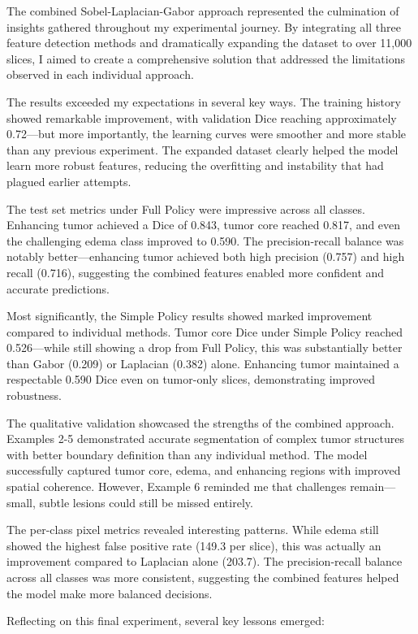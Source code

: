 The combined Sobel-Laplacian-Gabor approach represented the culmination of insights gathered throughout my experimental journey. By integrating all three feature detection methods and dramatically expanding the dataset to over 11,000 slices, I aimed to create a comprehensive solution that addressed the limitations observed in each individual approach.

The results exceeded my expectations in several key ways. The training history showed remarkable improvement, with validation Dice reaching approximately 0.72—but more importantly, the learning curves were smoother and more stable than any previous experiment. The expanded dataset clearly helped the model learn more robust features, reducing the overfitting and instability that had plagued earlier attempts.

The test set metrics under Full Policy were impressive across all classes. Enhancing tumor achieved a Dice of 0.843, tumor core reached 0.817, and even the challenging edema class improved to 0.590. The precision-recall balance was notably better—enhancing tumor achieved both high precision (0.757) and high recall (0.716), suggesting the combined features enabled more confident and accurate predictions.

Most significantly, the Simple Policy results showed marked improvement compared to individual methods. Tumor core Dice under Simple Policy reached 0.526—while still showing a drop from Full Policy, this was substantially better than Gabor (0.209) or Laplacian (0.382) alone. Enhancing tumor maintained a respectable 0.590 Dice even on tumor-only slices, demonstrating improved robustness.

The qualitative validation showcased the strengths of the combined approach. Examples 2-5 demonstrated accurate segmentation of complex tumor structures with better boundary definition than any individual method. The model successfully captured tumor core, edema, and enhancing regions with improved spatial coherence. However, Example 6 reminded me that challenges remain—small, subtle lesions could still be missed entirely.

The per-class pixel metrics revealed interesting patterns. While edema still showed the highest false positive rate (149.3 per slice), this was actually an improvement compared to Laplacian alone (203.7). The precision-recall balance across all classes was more consistent, suggesting the combined features helped the model make more balanced decisions.

Reflecting on this final experiment, several key lessons emerged:

